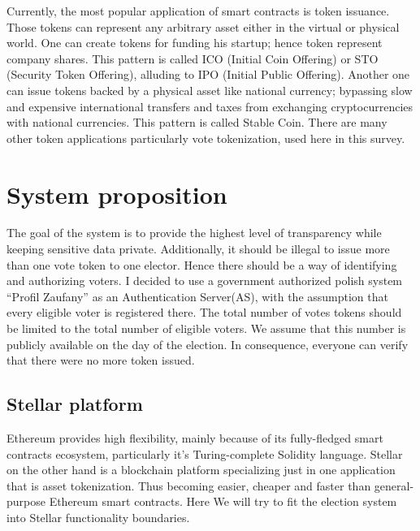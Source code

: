 \documentclass[runningheads]{llncs}
\begin{document}
Currently, the most popular application of smart contracts is token issuance. Those tokens can represent any arbitrary asset either in the virtual or physical world. One can create tokens for funding his startup; hence token represent company shares. This pattern is called ICO (Initial Coin Offering) or STO (Security Token Offering), alluding to IPO (Initial Public Offering). Another one can issue tokens backed by a physical asset like national currency; bypassing slow and expensive international transfers and taxes from exchanging cryptocurrencies with national currencies. This pattern is called Stable Coin. There are many other token applications particularly vote tokenization, used here in this survey.


\section{System proposition}
The goal of the system is to provide the highest level of transparency while keeping sensitive data private. Additionally, it should be illegal to issue more than one vote token to one elector. Hence there should be a way of identifying and authorizing voters. I decided to use a government authorized polish system
“Profil Zaufany” as an Authentication Server(AS), with the assumption that every eligible voter is registered there. The total number of votes tokens should be limited to the total number of eligible voters. We assume that this number is publicly available on the day of the election. In consequence, everyone can verify that there were no more token issued. 

\subsection{Stellar platform}
Ethereum provides high flexibility, mainly because of its fully-fledged smart contracts ecosystem, particularly it’s Turing-complete Solidity language. Stellar on the other hand is a blockchain platform specializing just in one application that is asset tokenization. Thus becoming easier, cheaper and faster than general-purpose Ethereum smart contracts. Here We will try to fit the election system into Stellar functionality boundaries.
\end{document}
